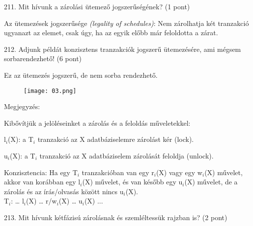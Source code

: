 \documentclass[a4paper,11.5pt, table]{article}
\begin{document}
211. Mit hívunk a zárolási ütemező jogszerűségének? (1 pont)
	\begin{compactitem}
		\item Az ütemezések jogszerűsége\textit{ (legality of schedules)}: 
		Nem zárolhatja két tranzakció ugyanazt az elemet, csak úgy, ha az egyik előbb már feloldotta a zárat.
	\end{compactitem}

212. Adjunk példát konzisztens tranzakciók jogszerű ütemezésére, ami mégsem sorbarendezhető! (6 pont)
	\begin{compactitem}
		\item Ez az ütemezés jogszerű, de nem sorba rendezhető. 
		\begin{figure}[h]
			\centering
			\texttt{[image: 03.png]}
		\end{figure}
		
		\item Megjegyzés:
		\begin{compactitem}
			\item Kibővítjük a jelöléseinket a zárolás és a feloldás műveletekkel:
			\begin{compactitem}
				\item l$ _{i} $(X): a T$ _{i} $ tranzakció az X adatbáziselemre zárolást kér (lock).
				\item u$ _{i} $(X): a T$ _{i} $ tranzakció az X adatbáziselem zárolását feloldja (unlock).
			\end{compactitem}
		\item Konzisztencia: Ha egy T$ _{i} $ tranzakcióban van egy r$ _{i} $(X) vagy egy w$ _{i} $(X) művelet, akkor van korábban egy l$ _{i} $(X) művelet, és van később egy u$ _{i} $(X) művelet, de a zárolás és az írás/olvasás között nincs u$ _{i} $(X).\\
		T$ _{i} $:  … l$ _{i} $(X) … r/w$ _{i} $(X) … u$ _{i} $(X) ...
		\end{compactitem}
	\end{compactitem}

213. Mit hívunk kétfázisú zárolásnak és szemléltessük rajzban is? (2 pont)
	\begin{compactitem}
		\item 
	\end{compactitem}
	
		
\end{document}

